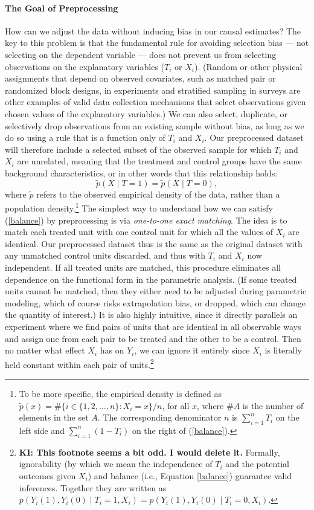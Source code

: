 \documentclass[11pt,titlepage]{article}
\begin{document}
\paragraph{The Goal of Preprocessing}
How can we adjust the data without inducing bias in our causal
estimates?  The key to this problem is that the fundamental rule for
avoiding selection bias --- not selecting on the dependent variable
--- does not prevent us from selecting observations on the explanatory
variables ($T_i$ or $X_i$).  (Random or other physical assignments
that depend on observed covariates, such as matched pair or randomized
block designs, in experiments and stratified sampling in surveys are
other examples of valid data collection mechanisms that select
observations given chosen values of the explanatory variables.)  We
can also select, duplicate, or selectively drop observations from an
existing sample without bias, as long as we do so using a rule that is
a function only of $T_i$ and $X_i$.  Our preprocessed dataset will
therefore include a selected subset of the observed sample for which
$T_i$ and $X_i$ are unrelated, meaning that the treatment and control
groups have the same background characteristics, or in other words
that this relationship holds:
\begin{equation}
  \label{balance}
  \tilde p(X\mid T=1) = \tilde p(X\mid T=0),
\end{equation}
where $\tilde p$ refers to the observed empirical density of the data,
rather than a population density.\footnote{To be more specific, the
  empirical density is defined as $\tilde p(x) = \# \{ i\in \{1, 2,
  \dots, n \}: X_i = x \} / n$, for all $x$, where $\#A$ is the number
  of elements in the set $A$.  The corresponding denominator $n$ is
  $\sum_{i=1}^n T_i$ on the left side and $\sum_{i=1}^n (1-T_i)$ on
  the right of (\ref{balance}).}  The simplest way to understand how
we can satisfy (\ref{balance}) by preprocessing is via
\emph{one-to-one exact matching}.  The idea is to match each treated
unit with one control unit for which all the values of $X_i$ are
identical.  Our preprocessed dataset thus is the same as the original
dataset with any unmatched control units discarded, and thus with
$T_i$ and $X_i$ now independent.  If all treated units are matched,
this procedure eliminates all dependence on the functional form in the
parametric analysis.  (If some treated units cannot be matched, then
they either need to be adjusted during parametric modeling, which of
course risks extrapolation bias, or dropped, which can change the
quantity of interest.) It is also highly intuitive, since it directly
parallels an experiment where we find pairs of units that are
identical in all observable ways and assign one from each pair to be
treated and the other to be a control.  Then no matter what effect
$X_i$ has on $Y_i$, we can ignore it entirely since $X_i$ is literally
held constant within each pair of units.\footnote{{\bf KI: This
    footnote seems a bit odd. I would delete it.} Formally,
  ignorability (by which we mean the independence of $T_i$ and the
  potential outcomes given $X_i$) and balance (i.e., Equation
  \ref{balance}) guarantee valid inferences.  Together they are
  written as $p(Y_i(1), Y_i(0)\mid T_i=1,X_i)=p(Y_i(1), Y_i(0)\mid
  T_i=0,X_i)$.}
\end{document}
